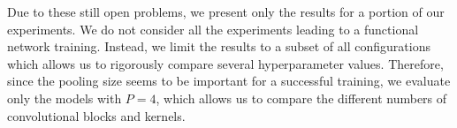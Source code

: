 Due to these still open problems, we present only the results for a portion of our experiments. We do not consider all the experiments leading to a functional network training. Instead, we limit the results to a subset of all configurations which allows us to rigorously compare several hyperparameter values. Therefore, since the pooling size seems to be important for a successful training, we evaluate only the models with $P=4$, which allows us to compare the different numbers of convolutional blocks and kernels.

\begin{table}[t]
\centering
{}
    

\end{table}
